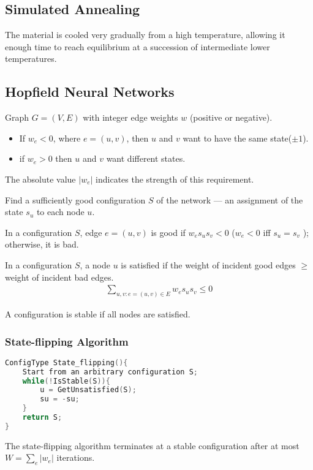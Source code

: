 \subsection{Simulated Annealing}
The material is cooled very gradually from a high temperature, allowing it enough time to reach equilibrium at a succession of intermediate lower temperatures.

\subsection{Hopfield Neural Networks}
Graph $G = (V, E)$ with integer edge weights $w$ (positive or negative).
\begin{itemize}
    \item If $w_e < 0$, where $e = (u, v)$, then $u$ and $v$ want to have the same state($\pm 1$). 
    \item if $w_e > 0$ then $u$ and $v$ want different states.
\end{itemize}
The absolute value $|w_e|$ indicates the strength of this requirement.

Find a sufficiently good configuration $S$ of the network --- an assignment of the state $s_u$ to each node $u$. 

\begin{definition}
    In a configuration $S$, edge $e = (u, v)$ is good if $w_e s_u s_v < 0$ ($w_e < 0$ iff $s_u = s_v$ ); otherwise, it is bad.
\end{definition}
\begin{definition}
    In a configuration $S$, a node $u$ is satisfied if the weight of incident good edges $\ge$ weight of incident bad edges.
    \begin{align*}
        \sum_{u,v:e=(u,v)\in E}w_es_us_v\le 0
    \end{align*}
\end{definition}
\begin{definition}
    A configuration is stable if all nodes are satisfied. 
\end{definition}

\subsubsection{State-flipping Algorithm}
\begin{lstlisting}[language={c++}]
ConfigType State_flipping(){
    Start from an arbitrary configuration S;
    while(!IsStable(S)){
        u = GetUnsatisfied(S);
        su = -su;
    }
    return S;
}
\end{lstlisting}
\begin{claim}
    The state-flipping algorithm terminates at a stable configuration after at most $\displaystyle W = \sum_e|w_e|$ iterations.
\end{claim}

